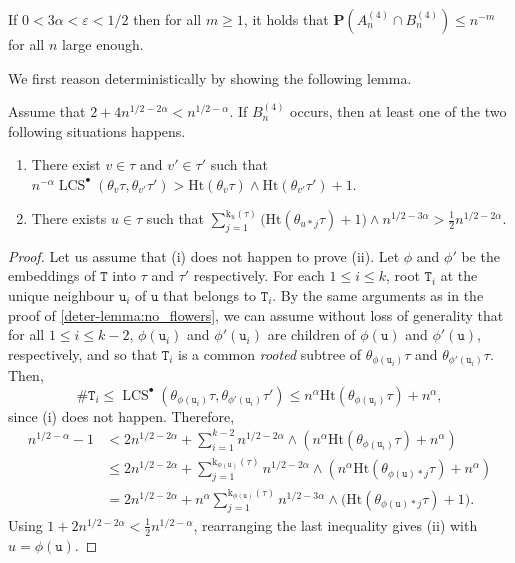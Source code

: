 \documentclass[11pt,reqno]{amsart}
\renewcommand{\P}{\mathbf{P}}
\newcommand{\1}{\mathbf{1}}
\newcommand{\0}{\mathbf{0}}
\newcommand{\ttT}{\mathtt{T}}
\newcommand{\ttu}{\mathtt{u}}
\newcommand{\Ht}{\mathrm{Ht}}
\newcommand{\rk}{\mathrm{k}}
\newcommand{\LCS}{\operatorname{LCS}}
\begin{document}
\begin{prop}
\label{prop:no_bushes}
If $0<3\alpha<\varepsilon<1/2$ then for all $m\geq1$, it holds that $\P(A_n^{(4)}\cap B_n^{(4)})\leq n^{-m}$ for all $n$ large enough.
\end{prop}

We first reason deterministically by showing the following lemma.

\begin{lem}
\label{deter-lemma:no_bushes}
Assume that $2+4n^{1/2-2\alpha}<n^{1/2-\alpha}$. If $B_n^{(4)}$ occurs, then at least one of the two following situations happens.
\begin{enumerate}
    \item[\emph{(i)}] There exist $v\in\tau$ and $v'\in\tau'$ such that $n^{-\alpha}\LCS^\bullet(\theta_v\tau,\theta_{v'}\tau')>\Ht(\theta_v\tau)\wedge\Ht(\theta_{v'}\tau')+1$.
    \item[\emph{(ii)}] There exists $u\in\tau$ such that $\sum_{j=1}^{\rk_u(\tau)}\big(\Ht(\theta_{u*j}\tau)+1\big)\wedge n^{1/2-3\alpha}>\tfrac{1}{2}n^{1/2-2\alpha}$.
\end{enumerate}
\end{lem}

\begin{proof}
Let us assume that (i) does not happen to prove (ii). Let $\phi$ and $\phi'$ be the embeddings of $\ttT$ into $\tau$ and $\tau'$ respectively. For each $1\leq i\leq k$, root $\ttT_i$ at the unique neighbour $\ttu_i$ of $\ttu$ that belongs to $\ttT_i$.  By the same arguments as in the proof of \cref{deter-lemma:no_flowers}, we can assume without loss of generality that for all $1\leq i\leq k-2$, $\phi(\ttu_i)$ and $\phi'(\ttu_i)$ are children of $\phi(\ttu)$ and $\phi'(\ttu)$, respectively, and so that $\ttT_i$ is a common \emph{rooted} subtree of $\theta_{\phi(\ttu_i)}\tau$ and $\theta_{\phi'(\ttu_i)}\tau$. Then, \[\#\ttT_i\leq\LCS^\bullet(\theta_{\phi(\ttu_i)}\tau,\theta_{\phi'(\ttu_i)}\tau')\leq n^\alpha \Ht(\theta_{\phi(\ttu_i)}\tau)+n^\alpha,\]
since (i) does not happen. Therefore,
\begin{align*}
n^{1/2-\alpha}-1&<2n^{1/2-2\alpha}+\sum_{i=1}^{k-2}n^{1/2-2\alpha}\wedge (n^\alpha\Ht(\theta_{\phi(\ttu_i)}\tau)+n^\alpha)\\
&\leq 2n^{1/2-2\alpha}+\sum_{j=1}^{\rk_{\phi(\ttu)}(\tau)}n^{1/2-2\alpha}\wedge (n^\alpha\Ht(\theta_{\phi(\ttu)*j}\tau)+n^\alpha)\\
&=2n^{1/2-2\alpha}+n^\alpha\sum_{j=1}^{\rk_{\phi(\ttu)}(\tau)}n^{1/2-3\alpha}\wedge \big(\Ht(\theta_{\phi(\ttu)*j}\tau)+1\big).
\end{align*}
Using $1+2n^{1/2-2\alpha}<\tfrac{1}{2}n^{1/2-\alpha}$, rearranging the last inequality gives (ii) with $u=\phi(\ttu)$.
\end{proof}
\end{document}
